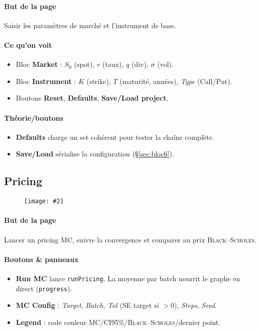 \documentclass[11pt,a4paper]{article}
\newcommand{\code}[1]{\texttt{#1}}
\newcommand{\imgfull}[2][\textwidth]{\begin{figure}[H]\centering\texttt{[image: \#2]}\end{figure}}
\newcommand{\bs}{\textsc{Black--Scholes}}
\newcommand{\ci}{\textsc{CI95}\%}
\newcommand{\mc}{\textsc{MC}}
\begin{document}
\paragraph{But de la page} Saisir les paramètres de marché et l’instrument de base.
\paragraph{Ce qu’on voit}
\begin{itemize}[leftmargin=*]
  \item Bloc \textbf{Market} : \(S_0\) (spot), \(r\) (taux), \(q\) (div), \(\sigma\) (vol).
  \item Bloc \textbf{Instrument} : \(K\) (strike), \(T\) (maturité, années), \textit{Type} (Call/Put).
  \item Boutons \textbf{Reset}, \textbf{Defaults}, \textbf{Save/Load project}.
\end{itemize}
\paragraph{Théorie/boutons}
\begin{itemize}[leftmargin=*]
  \item \textbf{Defaults} charge un set cohérent pour tester la chaîne complète.
  \item \textbf{Save/Load} sérialise la configuration (\S\ref{sec:bloc6}).
\end{itemize}

\subsection{Pricing}
\imgfull{pricing.png}
\paragraph{But de la page} Lancer un pricing \mc, suivre la convergence et comparer au prix \bs.
\paragraph{Boutons \& panneaux}
\begin{itemize}[leftmargin=*]
  \item \textbf{Run MC} lance \code{runPricing}. La moyenne par batch nourrit le graphe en direct (\code{progress}).
  \item \textbf{MC Config} : \emph{Target}, \emph{Batch}, \emph{Tol} (SE target si $>0$), \emph{Steps}, \emph{Seed}.
  \item \textbf{Legend} : code couleur \mc/\ci/\bs/dernier point.
\end{itemize}
\end{document}
